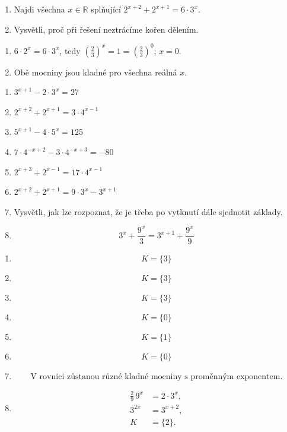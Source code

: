 \documentclass[11pt,a4paper]{article}
\begin{document}
\begin{zadaniReseniBox}[title={Rozšíření 1}]
\begin{enumerate}[label=\alph*)]
\item Najdi všechna $x\in\mathbb R$ splňující $2^{x+2}+2^{x+1}=6\cdot3^x$.
\item Vysvětli, proč při řešení neztrácíme kořen dělením.
\end{enumerate}
\tcblower
\begin{enumerate}[label=\alph*)]
\item $6\cdot2^x=6\cdot3^x$, tedy $\left(\frac{2}{3}\right)^x=1=\left(\frac{2}{3}\right)^0$; $x=0$.
\item Obě mocniny jsou kladné pro všechna reálná $x$.
\end{enumerate}
\end{zadaniReseniBox}
\begin{zadaniReseniBox}[title={Domácí úkol}]
\begin{enumerate}[label=\alph*)]
\item $3^{x+1}-2\cdot3^x=27$
\item $2^{x+2}+2^{x+1}=3\cdot4^{x-1}$
\item $5^{x+1}-4\cdot5^x=125$
\item $7\cdot4^{-x+2}-3\cdot4^{-x+3}=-80$
\item $2^{x+3}+2^{x-1}=17\cdot4^{x-1}$
\item $2^{x+2}+2^{x+1}=9\cdot3^x-3^{x+1}$
\item Vysvětli, jak lze rozpoznat, že je třeba po vytknutí dále sjednotit základy.
\item \[ 3^x+\frac{9^x}{3}=3^{x+1}+\frac{9^x}{9} \]
\end{enumerate}
\tcblower
\setlength{\abovedisplayskip}{2pt}\setlength{\belowdisplayskip}{2pt}
\setlength{\abovedisplayshortskip}{2pt}\setlength{\belowdisplayshortskip}{2pt}
\begin{enumerate}[label=\alph*)]
\item \[K=\{3\}\]
\item \[K=\{3\}\]
\item \[K=\{3\}\]
\item \[K=\{0\}\]
\item \[K=\{1\}\]
\item \[K=\{0\}\]
\item \[\text{V rovnici zůstanou různé kladné mocniny s proměnným exponentem.}\]
\item \[\begin{aligned}\frac{2}{9}\,9^x&=2\cdot3^x,\\3^{2x}&=3^{x+2},\\K&=\{2\}.\end{aligned}\]
\end{enumerate}
\end{zadaniReseniBox}
\end{document}
